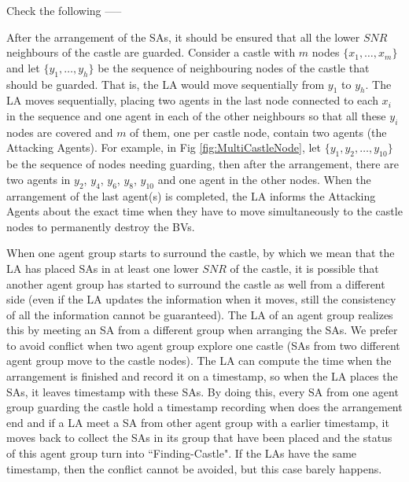\color{blue} Check the following ----- \color{black}

After the arrangement of the SAs, it should be ensured that all the lower $SNR$ neighbours of the castle are guarded. 
Consider a castle with $m$ nodes  $\{x_1, \ldots, x_m\}$ and let 
 $\{y_1, \ldots, y_h\}$ be the sequence of neighbouring nodes of the castle that should be guarded. That is, the LA would move sequentially from $y_1$ to $y_h$.
The LA  moves sequentially, placing two agents in the last node connected to each $x_i$ in the sequence and one agent in each of the other neighbours so that all these $y_i$
 nodes are covered and $m$ of them, one per castle node, contain two agents (the Attacking Agents).  
For example, in Fig \ref{fig:MultiCastleNode}, let  $\{y_1, y_2, \ldots, y_{10}\}$ be the sequence of nodes needing guarding, then after the arrangement, there are two agents in $y_2$, $y_4$, $y_6$, $y_8$, $y_{10}$ and one agent in the other nodes.
When   the arrangement of the last agent(s) is completed, the LA 
 informs the Attacking Agents about the  exact time  when they have to move simultaneously  
 to the castle nodes to permanently destroy the BVs.

When one agent group starts to surround the castle, by which we mean that the LA has placed SAs in at least one lower $SNR$ of the castle, it is possible that another agent group has started to surround the castle  as well from a different side 
(even if the LA updates the information when it moves, still the consistency of all the information cannot be guaranteed). The LA of an agent group realizes this by meeting an SA  from a different group when   arranging
 the SAs.
 We prefer to avoid conflict when two agent group explore one castle (SAs from two different agent group move to the castle nodes). The LA can compute the time when the arrangement is finished and record it on a timestamp, so when the LA places the SAs, it leaves timestamp with these SAs. By doing this, every SA from one agent group guarding the castle hold a timestamp recording when does the arrangement end and if a LA meet a SA from other agent group with a earlier timestamp, it moves back to collect the SAs in its group that have been placed and the status of this agent group turn into ``Finding-Castle". If the LAs have the same timestamp, then the conflict cannot be avoided, but this case barely happens.  

